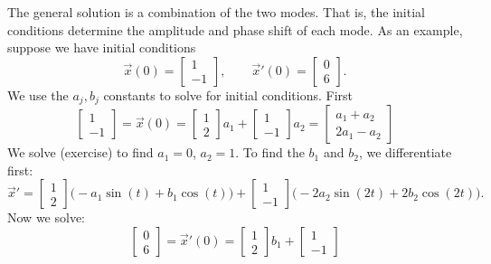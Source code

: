 \begin{example}
The general solution is a combination of the two modes.  That is, the
initial conditions determine the amplitude and phase shift of each mode.
As an example, suppose we have initial conditions
\begin{equation*}
\vec{x}(0) = 
\begin{bmatrix} 1 \\ -1 \end{bmatrix}
, \qquad
\vec{x}'(0) = 
\begin{bmatrix} 0 \\ 6 \end{bmatrix} .
\end{equation*}
We use the $a_j, b_j$ constants to solve for initial conditions.  First
\begin{equation*}
\begin{bmatrix} 1 \\ -1 \end{bmatrix}
=
\vec{x}(0) = 
\begin{bmatrix} 1 \\ 2 \end{bmatrix}
a_1
+
\begin{bmatrix} 1 \\ -1 \end{bmatrix}
a_2 
=
\begin{bmatrix} a_1+a_2 \\2a_1 - a_2 \end{bmatrix}
\end{equation*}
We solve (exercise) to find $a_1 = 0$, $a_2 = 1$.
To find the $b_1$ and $b_2$, we differentiate first:
\begin{equation*}
{\vec{x}}' = 
\begin{bmatrix} 1 \\ 2 \end{bmatrix}
\bigl( - a_1 \sin (t) + b_1 \cos (t) \bigr)
+
\begin{bmatrix} 1 \\ -1 \end{bmatrix}
\bigl( - 2a_2 \sin (2t) + 2 b_2 \cos (2t) \bigr) .
\end{equation*}
Now we solve:
\begin{equation*}
\begin{bmatrix} 0 \\ 6 \end{bmatrix}
=
{\vec{x}}'(0) = 
\begin{bmatrix} 1 \\ 2 \end{bmatrix}
b_1
+
\begin{bmatrix} 1 \\ -1 \end{bmatrix}

\end{equation*}
\end{example}
